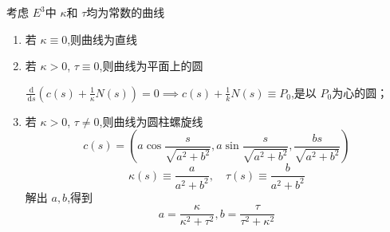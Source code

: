 \documentclass[../../古典微分几何.tex]{subfiles}
\begin{document}
\begin{proposition}
    考虑 \(  E^{3}  \)中 \(   \kappa   \)和 \(  \tau   \)均为常数的曲线
    \begin{enumerate}
        \item 若 \(   \kappa \equiv 0  \),则曲线为直线
        \item 若 \(   \kappa >0  \), \(  \tau \equiv 0  \),则曲线为平面上的圆
        \begin{exercise}
            \(  \frac{\,\mathrm{d}  }{\,\mathrm{d} s }   \left( c\left( s \right)+ \frac{1 }{ \kappa  }N\left( s \right)    \right)= 0 \implies c\left( s \right)+ \frac{1}{k}N\left( s \right)\equiv P_0   \),是以 \(  P_0  \)为心的圆；  
        \end{exercise}
        \item 若 \(   \kappa >0  \), \(  \tau \neq 0  \),则曲线为圆柱螺旋线 \[
        c\left( s \right)= \left(  a \cos \frac{s }{\sqrt{a^{2}+ b^{2}} }, a \sin \frac{s }{\sqrt{a^{2}+ b^{2}} }  ,\frac{bs }{\sqrt{a^{2}+ b^{2}} } \right)  
        \] \[
         \kappa \left( s \right)\equiv  \frac{a }{a^{2}+ b^{2} },\quad  \tau \left( s \right)\equiv \frac{b }{a^{2}+ b^{2} }    
        \]  解出 \(  a,b  \),得到 \[
        a =  \frac{ \kappa  }{ \kappa ^{2}+ \tau ^{2} }, b=  \frac{\tau  }{\tau ^{2}+  \kappa ^{2} }  
        \] 
        
        \hspace*{\fill} 
           
    \end{enumerate}
       
\end{proposition}
\end{document}
